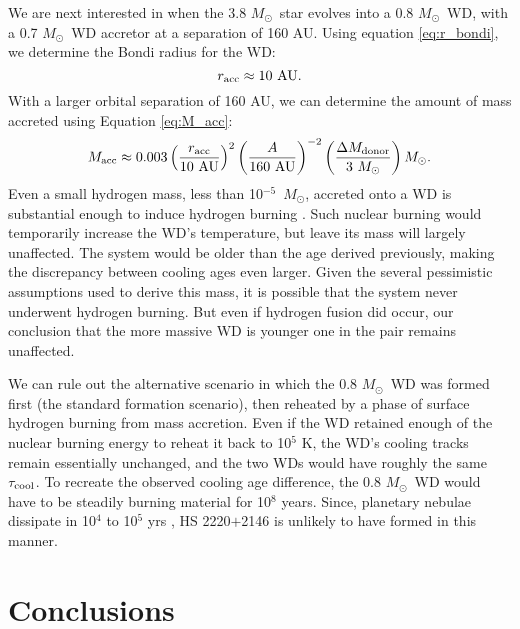 \documentclass{emulateapj}
\newcommand{\Msun}{\ifmmode {M_{\odot}}\else${M_{\odot}}$\fi}
\begin{document}
We are next interested in when the 3.8 \Msun\ star evolves into a 0.8 \Msun\ WD, with a 0.7 \Msun\ WD accretor at a separation of 160 AU. Using equation \ref{eq:r_bondi}, we determine the Bondi radius for the WD:
\begin{equation}
r_{\rm acc} \approx 10~ {\rm AU}. \label{eq:r_acc_2}
\end{equation}
With a larger orbital separation of 160 AU, we can determine the amount of mass accreted using Equation \ref{eq:M_acc}:
\begin{equation}
M_{\rm acc} \approx 0.003 \left( \frac{r_{\rm acc}}{10~ {\rm AU}} \right)^2 \left( \frac{A}{160~{\rm AU}} \right)^{-2} \left( \frac{\Delta M_{\rm donor}}{3~ \Msun} \right) \Msun. \nonumber
\end{equation}
Even a small hydrogen mass, less than 10$^{-5}$~\Msun, accreted onto a WD is substantial enough to induce hydrogen burning \citep[e.g.,][]{nomoto07, wolf13}. Such nuclear burning would temporarily increase the WD's temperature, but leave its mass will largely unaffected. The system would be older than the age derived previously, making the discrepancy between cooling ages even larger. Given the several pessimistic assumptions used to derive this mass, it is possible that the system never underwent hydrogen burning. But even if hydrogen fusion did occur, our conclusion that the more massive WD is younger one in the pair remains unaffected. 

We can rule out the alternative scenario in which the 0.8 \Msun\ WD was formed first (the standard formation scenario), then reheated by a phase of surface hydrogen burning from mass accretion. Even if the WD retained enough of the nuclear burning energy to reheat it back to 10$^5$ K, the WD's cooling tracks remain essentially unchanged, and the two WDs would have roughly the same $\tau_{\rm cool}$. To recreate the observed cooling age difference, the 0.8 \Msun\ WD would have to be steadily burning material for 10$^8$ years. Since, planetary nebulae dissipate in 10$^4$ to 10$^5$ yrs \citep{badenes15}, HS 2220$+$2146 is unlikely to have formed in this manner.










\section{Conclusions} \label{sec:concl}
\end{document}

